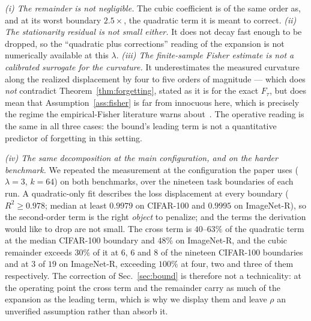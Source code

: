 \emph{(i) The remainder is not negligible.} The cubic coefficient is of the same order as,
and at its worst boundary $2.5\times$, the quadratic term it is meant to correct.
\emph{(ii) The stationarity residual is not small either.} It does not decay fast enough to
be dropped, so the ``quadratic plus corrections'' reading of the expansion is not
numerically available at this $\lambda$. \emph{(iii) The finite-sample Fisher estimate is
not a calibrated surrogate for the curvature.} It underestimates the measured curvature
along the realized displacement by four to five orders of magnitude --- which does
\emph{not} contradict Theorem~\ref{thm:forgetting}, stated as it is for the exact $F_\tau$,
but does mean that Assumption~\ref{ass:fisher} is far from innocuous here, which is
precisely the regime the empirical-Fisher literature warns
about~\cite{kunstner2019limitations}. The operative reading is the same in all three cases:
the bound's leading term is not a quantitative predictor of forgetting in this setting.

\emph{(iv) The same decomposition at the main configuration, and on the harder benchmark.}
We repeated the measurement at the configuration the paper uses ($\lambda{=}3$, $k{=}64$) on
both benchmarks, over the nineteen task boundaries of each run. A quadratic-only fit
describes the loss displacement at every boundary ($R^2\ge0.978$; median at least $0.9979$
on CIFAR-100 and $0.9995$ on ImageNet-R), so the second-order term is the right
\emph{object} to penalize; and the terms the derivation would like to drop are not small.
The cross term is $40$--$63\%$ of the quadratic term at the median CIFAR-100 boundary and
$48\%$ on ImageNet-R, and the cubic remainder exceeds $30\%$ of it at $6$, $6$ and $8$ of
the nineteen CIFAR-100 boundaries and at $3$ of $19$ on ImageNet-R, exceeding $100\%$ at
four, two and three of them respectively. The correction of Sec.~\ref{sec:bound} is
therefore not a technicality: at the operating point the cross term and the remainder carry
as much of the expansion as the leading term, which is why we display them and leave $\rho$
an unverified assumption rather than absorb it.

